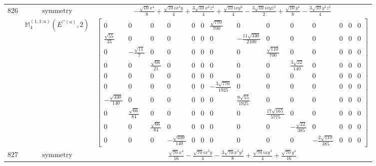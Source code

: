 \documentclass[fleqn,8pt,landscape]{jsarticle}
\begin{document}
\begin{longtable}{ccc}
$ 826 $ & $ \text{symmetry} $ & $ - \frac{\sqrt{10} x^{4}}{8} + \frac{\sqrt{10} i x^{3} y}{4} + \frac{3 \sqrt{10} x^{2} z^{2}}{4} + \frac{\sqrt{10} i x y^{3}}{4} - \frac{3 \sqrt{10} i x y z^{2}}{2} + \frac{\sqrt{10} y^{4}}{8} - \frac{3 \sqrt{10} y^{2} z^{2}}{4} $ \\
$  $ & $ \mathbb{M}_{4}^{(1,1;a)}(E^{\prime\prime(a)},2) $ & $ \begin{bmatrix} 0 & 0 & 0 & 0 & 0 & 0 & \frac{\sqrt{770}}{700} & 0 & 0 & 0 & 0 & 0 & 0 & 0 \\ \frac{\sqrt{55}}{35} & 0 & 0 & 0 & 0 & 0 & 0 & - \frac{11 \sqrt{330}}{2100} & 0 & 0 & 0 & 0 & 0 & 0 \\ 0 & - \frac{\sqrt{11}}{7} & 0 & 0 & 0 & 0 & 0 & 0 & \frac{\sqrt{110}}{700} & 0 & 0 & 0 & 0 & 0 \\ 0 & 0 & \frac{\sqrt{66}}{21} & 0 & 0 & 0 & 0 & 0 & 0 & \frac{3 \sqrt{22}}{140} & 0 & 0 & 0 & 0 \\ 0 & 0 & 0 & 0 & 0 & 0 & 0 & 0 & 0 & 0 & 0 & 0 & 0 & 0 \\ 0 & 0 & 0 & 0 & 0 & 0 & - \frac{3 \sqrt{770}}{1925} & 0 & 0 & 0 & 0 & 0 & 0 & 0 \\ - \frac{\sqrt{330}}{140} & 0 & 0 & 0 & 0 & 0 & 0 & \frac{9 \sqrt{55}}{1925} & 0 & 0 & 0 & 0 & 0 & 0 \\ 0 & \frac{\sqrt{66}}{84} & 0 & 0 & 0 & 0 & 0 & 0 & \frac{17 \sqrt{165}}{5775} & 0 & 0 & 0 & 0 & 0 \\ 0 & 0 & \frac{\sqrt{66}}{84} & 0 & 0 & 0 & 0 & 0 & 0 & - \frac{\sqrt{22}}{385} & 0 & 0 & 0 & 0 \\ 0 & 0 & 0 & - \frac{\sqrt{330}}{140} & 0 & 0 & 0 & 0 & 0 & 0 & - \frac{2 \sqrt{110}}{385} & 0 & 0 & 0 \end{bmatrix} $ \\ \hline
$ 827 $ & $ \text{symmetry} $ & $ \frac{\sqrt{70} x^{4}}{16} - \frac{\sqrt{70} i x^{3} y}{4} - \frac{3 \sqrt{70} x^{2} y^{2}}{8} + \frac{\sqrt{70} i x y^{3}}{4} + \frac{\sqrt{70} y^{4}}{16} $ \\

\end{longtable}
\end{document}
